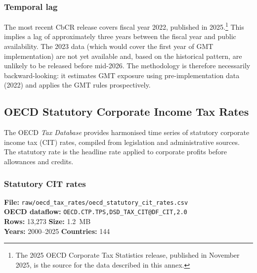 \documentclass[11pt,a4paper]{article}
\begin{document}
\subsubsection{Temporal lag}

The most recent CbCR release covers fiscal year 2022, published in
2025.\footnote{The 2025 OECD Corporate Tax Statistics release, published in
November 2025, is the source for the data described in this annex.} This implies a
lag of approximately three years between the fiscal year and public availability.
The 2023 data (which would cover the first year of GMT implementation) are not yet
available and, based on the historical pattern, are unlikely to be released before
mid-2026. The methodology is therefore necessarily backward-looking: it estimates
GMT exposure using pre-implementation data (2022) and applies the GMT rules
prospectively.



\subsection{OECD Statutory Corporate Income Tax Rates}\label{sec:cit}

The OECD \emph{Tax Database} provides harmonised time series of statutory corporate income tax (CIT) rates, compiled from legislation and administrative sources.  The statutory rate is the headline rate applied to corporate profits before allowances and credits.

\subsubsection{Statutory CIT rates}

\textbf{File:} \texttt{raw/oecd\_tax\_rates/oecd\_statutory\_cit\_rates.csv}\\
\textbf{OECD dataflow:} \texttt{OECD.CTP.TPS,DSD\_TAX\_CIT@DF\_CIT,2.0}\\
\textbf{Rows:} 13{,}273 \quad \textbf{Size:} 1.2~MB\\
\textbf{Years:} 2000--2025 \quad \textbf{Countries:} 144
\end{document}
